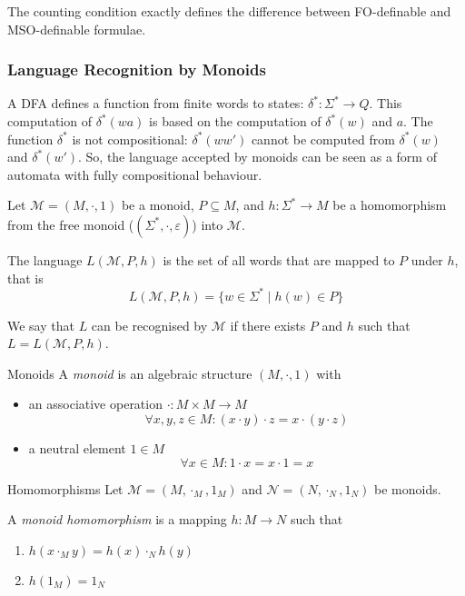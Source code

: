 \documentclass[english]{panikzettel}
\begin{document}
The counting condition exactly defines the difference between FO-definable and MSO-definable formulae.

\subsubsection{Language Recognition by Monoids}
\label{sssec:monoids}
\begin{halfboxl}
    A DFA defines a function from finite words to states: $\delta^* : \Sigma^* \rightarrow Q$.
    This computation of $\delta^*(wa)$ is based on the computation of $\delta^*(w)$ and $a$.
    The function $\delta^*$ is not compositional: $\delta^*(ww')$ cannot be computed from $\delta^*(w)$ and $\delta^*(w')$.
    So, the language accepted by monoids can be seen as a form of automata with fully compositional behaviour.

    Let $\mathcal{M}=(M,\cdot,1)$ be a monoid, $P \subseteq M$, and $h: \Sigma^* \rightarrow M$ be a homomorphism from the free monoid ($(\Sigma^*,\cdot, \varepsilon)$) into $\mathcal{M}$.

    The language $L(\mathcal{M},P,h)$ is the set of all words that are mapped to $P$ under $h$, that is
    $$L(\mathcal{M},P,h)=\{w \in \Sigma^* \mid h(w) \in P\}$$

    We say that $L$ can be recognised by $\mathcal{M}$ if there exists $P$ and $h$ such that $L=L(\mathcal{M},P,h)$.
\end{halfboxl}%
\begin{halfboxr}
    \vspace{-\baselineskip}
    \begin{defi}{Monoids}
        A \emph{monoid} is an algebraic structure $(M, \cdot,1)$ with
        \begin{itemize}[leftmargin=*]
            \item an associative operation $\cdot : M \times M \rightarrow M$
            $$\forall x,y,z \in M : (x \cdot y) \cdot z = x \cdot (y \cdot z)$$
            \item a neutral element $1 \in M$
            $$\forall x \in M : 1 \cdot x = x \cdot 1 = x$$
        \end{itemize}
    \end{defi}

    \begin{defi}{Homomorphisms}
        Let $\mathcal{M}=(M,\cdot_M, 1_M)$ and $\mathcal{N}=(N,\cdot_N,1_N)$ be monoids.

        A \emph{monoid homomorphism} is a mapping $h : M \rightarrow N$ such that
        \begin{enumerate}
            \item $h(x \cdot_M y)=h(x) \cdot_N h(y)$
            \item $h(1_M)=1_N$
        \end{enumerate}
    \end{defi}
\end{halfboxr}
\end{document}
